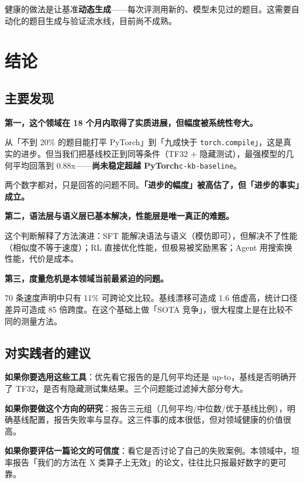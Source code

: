 健康的做法是让基准\textbf{动态生成}——每次评测用新的、模型未见过的题目。这需要自动化的题目生成与验证流水线，目前尚不成熟。


\section{结论}

\subsection{主要发现}

\textbf{第一，这个领域在 18 个月内取得了实质进展，但幅度被系统性夸大。}


从「不到 20\% 的题目能打平 PyTorch」到「九成快于 \texttt{torch.compile}」，这是真实的进步。但当我们把基线校正到同等条件（TF32 + 隐藏测试），最强模型的几何平均回落到 0.88x——\textbf{尚未稳定超越 PyTorch}{\scriptsize\texttt{c-\hspace{0pt}kb-\hspace{0pt}baseline}}。


两个数字都对，只是回答的问题不同。\textbf{「进步的幅度」被高估了，但「进步的事实」成立。}


\textbf{第二，语法层与语义层已基本解决，性能层是唯一真正的难题。}


这个判断解释了方法演进：SFT 能解决语法与语义（模仿即可），但解决不了性能（相似度不等于速度）；RL 直接优化性能，但极易被奖励黑客；Agent 用搜索换性能，代价是成本。


\textbf{第三，度量危机是本领域当前最紧迫的问题。}


70 条速度声明中只有 11\% 可跨论文比较。基线漂移可造成 1.6 倍虚高，统计口径差异可造成 85 倍跨度。在这个基础上做「SOTA 竞争」，很大程度上是在比较不同的测量方法。


\subsection{对实践者的建议}

\textbf{如果你要选用这些工具}：优先看它报告的是几何平均还是 up-to，基线是否明确开了 TF32，是否有隐藏测试集结果。三个问题能过滤掉大部分夸大。


\textbf{如果你要做这个方向的研究}：报告三元组（几何平均/中位数/优于基线比例），明确基线配置，报告失败率与显存。这三件事的成本很低，但对领域健康的价值很高。


\textbf{如果你要评估一篇论文的可信度}：看它是否讨论了自己的失败案例。本领域中，坦率报告「我们的方法在 X 类算子上无效」的论文，往往比只报最好数字的更可靠。


